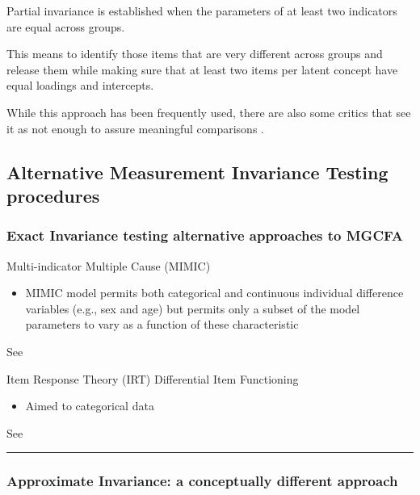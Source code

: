 \documentclass[
]{book}
\providecommand{\tightlist}{%
  \setlength{\itemsep}{0pt}\setlength{\parskip}{0pt}}
\begin{document}
Partial invariance is established when the parameters of at least two indicators are equal across groups.

This means to identify those items that are very different across groups and release them while making sure that at least two items per latent concept have equal loadings and intercepts.

While this approach has been frequently used, there are also some critics that see it as not enough to assure meaningful comparisons \citep{DeBeuckelaer2011, Steinmetz2018EstimationAC}.

\hypertarget{alternative-measurement-invariance-testing-procedures}{%
\subsection{Alternative Measurement Invariance Testing procedures}\label{alternative-measurement-invariance-testing-procedures}}

\hypertarget{exact-invariance-testing-alternative-approaches-to-mgcfa}{%
\subsubsection{Exact Invariance testing alternative approaches to MGCFA}\label{exact-invariance-testing-alternative-approaches-to-mgcfa}}

Multi-indicator Multiple Cause (MIMIC)

\begin{itemize}
\tightlist
\item
  MIMIC model permits both categorical and continuous individual difference variables (e.g., sex and age) but permits only a subset of the model parameters to vary as a function of these characteristic
\end{itemize}

See \citep{Kim2012}

Item Response Theory (IRT) Differential Item Functioning

\begin{itemize}
\tightlist
\item
  Aimed to categorical data
\end{itemize}

See \citep{Tay2015}

\begin{center}\rule{0.5\linewidth}{0.5pt}\end{center}

\hypertarget{approximate-invariance-a-conceptually-different-approach}{%
\subsubsection{Approximate Invariance: a conceptually different approach}\label{approximate-invariance-a-conceptually-different-approach}}
\end{document}

